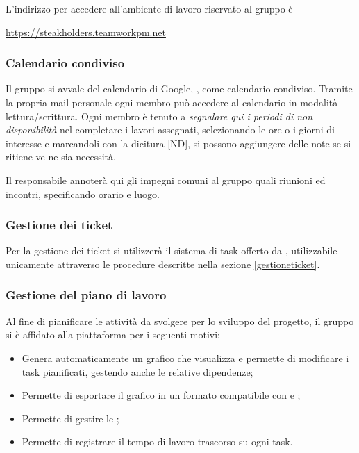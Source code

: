 		L'indirizzo per accedere all'ambiente di lavoro riservato al gruppo è
		\begin{center}
			\url{https://steakholders.teamworkpm.net}
		\end{center}
		
		\subsubsection{Calendario condiviso}
		\label{Calendario condiviso}
				
		Il gruppo si avvale del calendario di Google, , come calendario condiviso.
		Tramite la propria mail personale ogni membro può accedere al calendario in modalità lettura/scrittura.
		Ogni membro è tenuto a \emph{segnalare qui i periodi di non disponibilità} nel completare i lavori assegnati, selezionando le ore o i giorni di interesse e marcandoli con la dicitura [ND], si possono aggiungere delle note se si ritiene ve ne sia necessità. 
		
		Il responsabile annoterà qui gli impegni comuni al gruppo quali riunioni ed incontri, specificando orario e luogo.
		
		\subsubsection{Gestione dei ticket}
		\label{teamwork}
		Per la gestione dei ticket si utilizzerà il sistema di task offerto da , utilizzabile unicamente attraverso le procedure descritte nella sezione \ref{gestioneticket}.
		
		\subsubsection{Gestione del piano di lavoro}
		
		Al fine di pianificare le attività da svolgere per lo sviluppo del progetto, il gruppo si è affidato alla piattaforma  per i seguenti motivi:
		\begin{itemize}
			\item Genera automaticamente un grafico  che visualizza e permette di modificare i task pianificati, gestendo anche le relative dipendenze;
			\item Permette di esportare il grafico  in un formato compatibile con  e ;
			\item Permette di gestire le ;
			\item Permette di registrare il tempo di lavoro trascorso su ogni task.
		\end{itemize}

